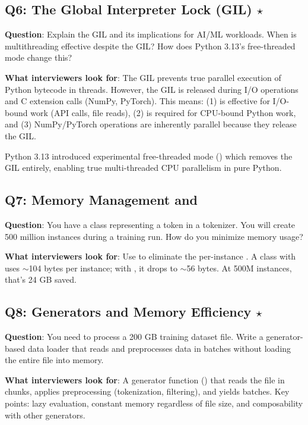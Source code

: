 \subsection{Q6: The Global Interpreter Lock (GIL) $\star$}

\textbf{Question}: Explain the GIL and its implications for AI/ML workloads. When is multithreading effective despite the GIL? How does Python 3.13's free-threaded mode change this?

\textbf{What interviewers look for}: The GIL prevents true parallel execution of Python bytecode in threads. However, the GIL is released during I/O operations and C extension calls (NumPy, PyTorch). This means: (1)  is effective for I/O-bound work (API calls, file reads), (2)  is required for CPU-bound Python work, and (3) NumPy/PyTorch operations are inherently parallel because they release the GIL.

Python 3.13 introduced experimental free-threaded mode () which removes the GIL entirely, enabling true multi-threaded CPU parallelism in pure Python.

\subsection{Q7: Memory Management and }

\textbf{Question}: You have a class representing a token in a tokenizer. You will create 500 million instances during a training run. How do you minimize memory usage?

\textbf{What interviewers look for}: Use  to eliminate the per-instance . A class with  uses $\sim$104 bytes per instance; with , it drops to $\sim$56 bytes. At 500M instances, that's 24 GB saved.

\subsection{Q8: Generators and Memory Efficiency $\star$}

\textbf{Question}: You need to process a 200 GB training dataset file. Write a generator-based data loader that reads and preprocesses data in batches without loading the entire file into memory.

\textbf{What interviewers look for}: A generator function () that reads the file in chunks, applies preprocessing (tokenization, filtering), and yields batches. Key points: lazy evaluation, constant memory regardless of file size, and composability with other generators.

